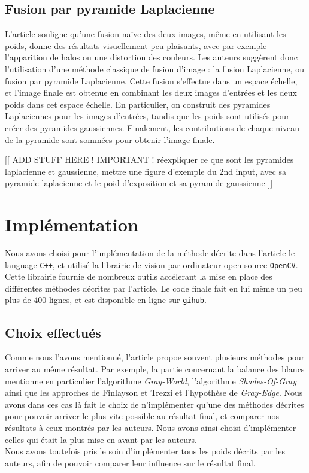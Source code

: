 \documentclass[twoside]{article}
\begin{document}
\subsection{Fusion par pyramide Laplacienne}
L'article souligne qu'une fusion naïve des deux images, même en utilisant les poids, donne des résultats visuellement peu plaisants, avec par exemple l'apparition de halos ou une distortion des couleurs. Les auteurs suggèrent donc l'utilisation d'une méthode classique de fusion d'image : la fusion Laplacienne, ou fusion par pyramide Laplacienne. Cette fusion s'effectue dans un espace échelle, et l'image finale est obtenue en combinant les deux images d'entrées et les deux poids dans cet espace échelle. En particulier, on construit des pyramides Laplaciennes pour les images d'entrées, tandis que les poids sont utilisés pour créer des pyramides gaussiennes. Finalement, les contributions de chaque niveau de la pyramide sont sommées pour obtenir l'image finale.

[[ ADD STUFF HERE ! IMPORTANT ! réexpliquer ce que sont les pyramides laplacienne et gaussienne, mettre une figure d’exemple du 2nd input, avec sa pyramide laplacienne et le poid d’exposition et sa pyramide gaussienne ]]

\section{Implémentation}
Nous avons choisi pour l'implémentation de la méthode décrite dans l'article le language \texttt{C++}, et utilisé la librairie de vision par ordinateur open-source \texttt{OpenCV}. Cette librairie fournie de nombreux outils accélerant la mise en place des différentes méthodes décrites par l'article. Le code finale fait en lui même un peu plus de 400 lignes, et est disponible en ligne sur \texttt{\href{http://github.com/jcaille/Submarine}{gihub}}.

\subsection{Choix effectués}
Comme nous l'avons mentionné, l'article propoe souvent plusieurs méthodes pour arriver au même résultat. Par exemple, la partie concernant la balance des blancs mentionne en particulier l'algorithme \emph{Gray-World}, l'algorithme \emph{Shades-Of-Gray} ainsi que les approches de Finlayson et Trezzi et l'hypothèse de \emph{Gray-Edge}. Nous avons dans ces cas là fait le choix de n'implémenter qu'une des méthodes décrites pour pouvoir arriver le plus vite possible au résultat final, et comparer nos résultats à ceux montrés par les auteurs. Nous avons ainsi choisi d'implémenter celles qui était la plus mise en avant par les auteurs.\\
Nous avons toutefois pris le soin d'implémenter tous les poids décrits par les auteurs, afin de pouvoir comparer leur influence sur le résultat final.
\end{document}
